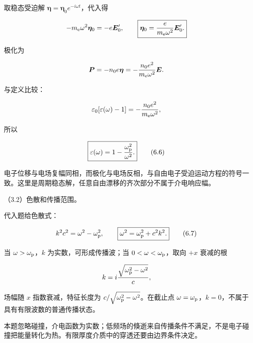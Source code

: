 \documentclass[12pt,a4paper,fontset=fandol]{ctexart}
\begin{document}
取稳态受迫解 \(\boldsymbol\eta=\boldsymbol\eta_0e^{-i\omega t}\)，代入得

\[
-m_{\rm e}\omega^2\boldsymbol\eta_0=-e\boldsymbol E_0',
\qquad
\boxed{\boldsymbol\eta_0=\frac{e}{m_{\rm e}\omega^2}\boldsymbol E_0'.}
\]

极化为

\[
\boldsymbol P=-n_0e\boldsymbol\eta
=-\frac{n_0e^2}{m_{\rm e}\omega^2}\boldsymbol E.
\]

与定义比较：

\[
\varepsilon_0[\varepsilon(\omega)-1]
=-\frac{n_0e^2}{m_{\rm e}\omega^2},
\]

所以

\[
\boxed{\varepsilon(\omega)=1-\frac{\omega_{\rm p}^2}{\omega^2}.}
\tag{6.6}
\]

电子位移与电场复幅同相，而极化与电场反相，与自由电子受迫运动方程的符号一致。这里是周期稳态解，任意自由漂移的齐次部分不属于介电响应幅。

（3.2）色散和传播范围。

代入题给色散式：

\[
k^2c^2=\omega^2-\omega_{\rm p}^2,
\qquad
\boxed{\omega^2=\omega_{\rm p}^2+c^2k^2.}
\tag{6.7}
\]

当 \(\omega>\omega_{\rm p}\)，\(k\) 为实数，可形成传播波；当
\(0<\omega<\omega_{\rm p}\)，取向 \(+x\) 衰减的根

\[
k=i\frac{\sqrt{\omega_{\rm p}^2-\omega^2}}c,
\]

场幅随 \(x\) 指数衰减，特征长度为
\(c/\sqrt{\omega_{\rm p}^2-\omega^2}\)。在截止点
\(\omega=\omega_{\rm p}\)，\(k=0\)，不属于具有有限波数的普通传播状态。

本题忽略碰撞，介电函数为实数；低频场的倏逝来自传播条件不满足，不是电子碰撞把能量转化为热。有限厚度介质中的穿透还要由边界条件决定。

\begin{center}
\begin{minipage}{\linewidth}
\centering\begingroup
{}
\ifdim\wd\diagrambox>.88\linewidth
\sbox{\diagrambox}{\resizebox{.88\linewidth}{!}{\usebox{\diagrambox}}}
\fi
\ifdim\ht\diagrambox>.29\textheight
\resizebox{!}{.29\textheight}{\usebox{\diagrambox}}
\else\usebox{\diagrambox}\fi
\par{}
\endgroup\end{minipage}
\end{center}
\end{document}
